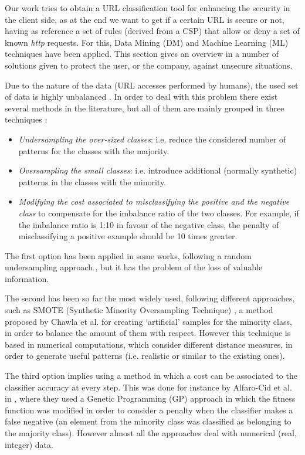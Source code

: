 \documentclass{llncs}
\begin{document}
\noindent Our work tries to obtain a URL classification tool for
enhancing the security in the client side, as at the end we want to
get if a certain URL is secure or not, having as reference a set of
rules (derived from a CSP) that allow or deny a set of known
\textit{http} requests. For this, Data Mining (DM) and Machine
Learning (ML) techniques have been applied. This section gives an
overview in a number of solutions given to protect the user, or the
company, against unsecure situations. 

Due to the nature of the data (URL accesses performed by humans), the used set of data is highly unbalanced \cite{imbalanced_data_05}. In order to deal with this problem there exist several methods in the
literature, but all of them are mainly grouped in three techniques
\cite{imbalance_techniques_02}: 

\begin{itemize}
\item \textit{Undersampling the over-sized classes}: i.e. reduce the considered number of patterns for the classes with the majority.
\item \textit{Oversampling the small classes}: i.e. introduce additional (normally synthetic) patterns in the classes with the minority.
\item \textit{Modifying the cost associated to misclassifying the positive and the negative class} to compensate for the imbalance ratio of the two classes. For example, if the imbalance ratio is 1:10 in favour of the negative class, the penalty of misclassifying a positive example should be 10 times greater.
\end{itemize}

The first option has been applied in some works, following a random undersampling approach \cite{random_undersampling_08}, but it has the problem of the loss of valuable information. 

The second has been so far the most widely used, following different approaches, such as SMOTE (Synthetic Minority Oversampling Technique) \cite{smote_02}, a method proposed by Chawla et al. for creating `artificial' samples for the minority class, in order to balance the amount of them with respect. However this technique is based in numerical computations, which consider different distance measures, in order to generate useful patterns  (i.e. realistic or similar to the existing ones).

The third option implies using a method in which a cost can be associated to the classifier accuracy at every step. This was done for instance by Alfaro-Cid et al. in \cite{cost_adjustment_07}, where they used a Genetic Programming (GP) approach in which the fitness function was modified in order to consider a penalty when the classifier makes a false negative (an element from the minority class was classified as belonging to the majority class).
However almost all the approaches deal with numerical (real, integer) data.
\end{document}
